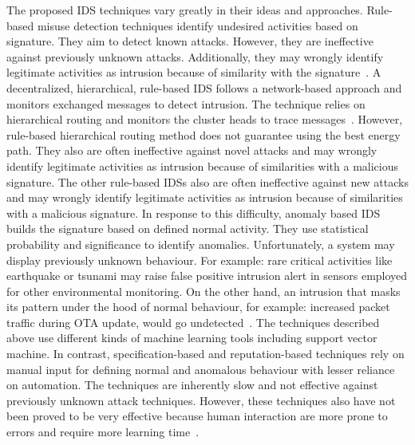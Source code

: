 \documentclass[conference,final]{IEEEtran}
\begin{document}
The proposed IDS techniques vary greatly in their ideas and approaches.
Rule-based misuse detection  techniques identify undesired activities based  on signature.
They aim to detect known attacks.
However, they are ineffective against previously unknown attacks.
Additionally, they may wrongly identify legitimate activities as intrusion because of similarity with the signature~\cite{372146, 1515559, ISI:000298891500099, Chen:2009:NMI:1516241.1516282, 1424814, Strikos_afull}.
A decentralized, hierarchical, rule-based IDS follows a network-based approach  and monitors exchanged  messages to detect intrusion. 
The technique relies on hierarchical routing  and monitors the cluster heads to trace messages~\cite{ioa07}.
However, rule-based hierarchical routing method does not guarantee using the best energy path.
They also are often ineffective against novel attacks and may wrongly identify legitimate activities as intrusion because of similarities with a malicious signature. 
The other rule-based IDSs also are often ineffective against new attacks and may wrongly identify legitimate activities as intrusion because of similarities with a malicious signature. 
In response to this difficulty, anomaly based IDS builds the signature based on defined normal activity.
They use statistical probability and significance to identify anomalies. Unfortunately, a system may display previously unknown behaviour.
For example: rare critical activities like earthquake or tsunami may raise false positive intrusion alert in sensors employed for other environmental monitoring.
On the other hand, an intrusion that masks its pattern under the hood of normal behaviour, for example: increased packet traffic during OTA update, would go undetected~\cite{ISI:000257882502160, 1593102, 1290173, ngai07}. %
The techniques described above use different kinds of machine learning tools including support vector machine.
In contrast, specification-based and reputation-based techniques rely on manual input for defining normal and anomalous behaviour with lesser reliance on automation.
The techniques are inherently slow and not effective against previously unknown attack techniques.
However, these techniques also have not been proved to be very effective because human interaction are more prone to errors and require more learning time~\cite{Chen:2009:NMI:1516241.1516282, 4085803, Ko2001}. 
\end{document}
